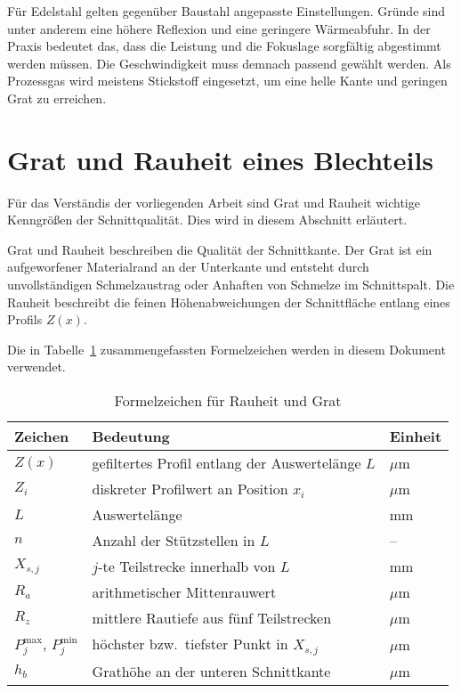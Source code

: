 Für Edelstahl gelten gegenüber Baustahl angepasste Einstellungen. Gründe sind unter anderem eine höhere Reflexion und eine geringere Wärmeabfuhr. In der Praxis bedeutet das, dass die Leistung und die Fokuslage sorgfältig abgestimmt werden müssen. Die Geschwindigkeit muss demnach passend gewählt werden. Als Prozessgas wird meistens Stickstoff eingesetzt, um eine helle Kante und geringen Grat zu erreichen.

\section{Grat und Rauheit eines Blechteils}
\label{sec:grat-rauheit}

Für das Verständis der vorliegenden Arbeit sind Grat und Rauheit wichtige Kenngrößen der Schnittqualität. Dies wird in diesem Abschnitt erläutert.

Grat und Rauheit beschreiben die Qualität der Schnittkante. Der Grat ist ein aufgeworfener Materialrand an der Unterkante und entsteht durch unvollständigen Schmelzaustrag oder Anhaften von Schmelze im Schnittspalt. Die Rauheit beschreibt die feinen Höhenabweichungen der Schnittfläche entlang eines Profils \(Z(x)\).

Die in Tabelle~\ref{tab:symbole-rauheit-grat} zusammengefassten Formelzeichen werden in diesem Dokument verwendet.
\begin{table}[htbp]
  \centering
  \caption{Formelzeichen für Rauheit und Grat}
  \label{tab:symbole-rauheit-grat}
  \begin{tabular}{@{}lll@{}}
    \toprule
    Zeichen & Bedeutung & Einheit \\
    \midrule
    $Z(x)$      & gefiltertes Profil entlang der Auswertelänge $L$ & $\mu$m \\
    $Z_i$       & diskreter Profilwert an Position $x_i$            & $\mu$m \\
    $L$         & Auswertelänge                                      & mm \\
    $n$         & Anzahl der Stützstellen in $L$                     & -- \\
    $X_{s,j}$   & $j$-te Teilstrecke innerhalb von $L$               & mm \\
    $R_a$       & arithmetischer Mittenrauwert                       & $\mu$m \\
    $R_z$       & mittlere Rautiefe aus fünf Teilstrecken            & $\mu$m \\
    $P^{\max}_{j}$, $P^{\min}_{j}$ & höchster bzw.\ tiefster Punkt in $X_{s,j}$ & $\mu$m \\
    $h_b$       & Grathöhe an der unteren Schnittkante               & $\mu$m \\
    \bottomrule
  \end{tabular}
\end{table}


